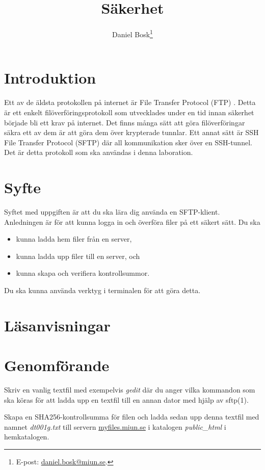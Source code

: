 \documentclass[11pt,a4paper]{miunasgn}
\title{Säkerhet}
\author{Daniel Bosk\footnote{%
	E-post: \href{mailto:daniel.bosk@miun.se}{daniel.bosk@miun.se}.
}}
\date{\svnId}
\begin{document}
\maketitle
\thispagestyle{foot}
\tableofcontents

\section{Introduktion}
\label{sec:Introduktion}
\noindent
Ett av de äldsta protokollen på internet är File Transfer Protocol (FTP) 
\citep{rfc959}.
Detta är ett enkelt filöverföringsprotokoll som utvecklades under en tid innan 
säkerhet började bli ett krav på internet.
Det finns många sätt att göra filöverföringar säkra ett av dem är att göra dem 
över krypterade tunnlar.
Ett annat sätt är SSH File Transfer Protocol (SFTP) där all kommunikation sker 
över en SSH-tunnel.
Det är detta protokoll som ska användas i denna laboration.


\section{Syfte}
\label{sec:Syfte}
\noindent
Syftet med uppgiften är att du ska lära dig använda en SFTP-klient.
Anledningen är för att kunna logga in och överföra filer på ett säkert sätt.
Du ska
\begin{itemize}
	\item kunna ladda hem filer från en server,
	\item kunna ladda upp filer till en server, och
	\item kunna skapa och verifiera kontrollsummor.
\end{itemize}
Du ska kunna använda verktyg i terminalen för att göra detta.


\section{Läsanvisningar}
\label{sec:Lasanvisningar}
\noindent



\section{Genomförande}
\label{sec:Genomforande}
\noindent
Skriv en vanlig textfil med exempelvis \emph{gedit} där du anger vilka 
kommandon som ska köras för att ladda upp en textfil till en annan dator med 
hjälp av sftp(1).

Skapa en SHA256-kontrollsumma för filen och ladda sedan upp denna textfil med 
namnet \emph{dt001g.txt} till servern \url{myfiles.miun.se} i katalogen 
\emph{public\_html} i hemkatalogen.
\end{document}

